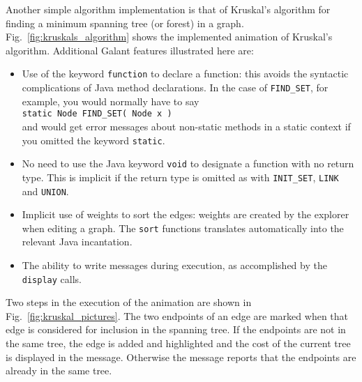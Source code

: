 



Another simple algorithm implementation is that of Kruskal's algorithm
for finding a minimum spanning tree (or forest) in a graph.
Fig.~\ref{fig:kruskals_algorithm}
shows the implemented animation of Kruskal's algorithm.
Additional Galant features illustrated here are:
\begin{itemize}

\item
Use of the keyword \verb+function+ to declare a function: this avoids the
syntactic complications of Java method declarations. In the case of
\verb+FIND_SET+, for example, you would normally have to say\\
\verb+static Node FIND_SET( Node x )+\\
and would get error messages about non-static methods in a static context
if you omitted the keyword \verb+static+.

\item
No need to use the Java keyword \verb+void+ to designate a function with
no return type. This is implicit if the return type is omitted as with
\verb+INIT_SET+, \verb+LINK+ and \verb+UNION+.

\item Implicit use of weights to sort the edges: weights are created by the
  explorer when editing a graph. The \verb+sort+ functions translates
  automatically into the relevant Java incantation.

\item
The ability to write messages during execution, as accomplished by the
\verb+display+ calls.

\end{itemize}

Two steps in the execution of the animation are shown
in Fig.~\ref{fig:kruskal_pictures}.
The two endpoints of an edge are marked when that edge is considered
for inclusion in the spanning tree.
If the endpoints are not in the same tree, the edge is added and highlighted
and the cost of the current tree is displayed in the message.
Otherwise the message reports that the endpoints are already in the same tree. 
